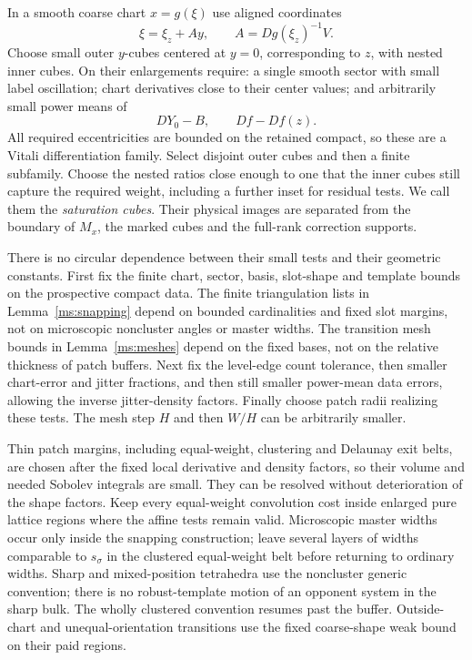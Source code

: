 \documentclass[11pt]{article}
\numberwithin{equation}{section}
\theoremstyle{definition}
\theoremstyle{remark}
\begin{document}
In a smooth coarse chart $x=g(\xi)$ use aligned coordinates
\[
 \xi=\xi_z+A y,\qquad A=Dg(\xi_z)^{-1}V.
\]
Choose small outer $y$-cubes centered at $y=0$, corresponding to $z$,
with nested inner cubes.
On their enlargements require: a single smooth sector with small
label oscillation; chart derivatives close to their center values;
and arbitrarily small power means of
\[
                         DY_0-B,\qquad Df-Df(z).
\]
All required eccentricities are bounded on the retained compact, so
these are a Vitali differentiation family.  Select disjoint outer
cubes and then a finite subfamily.  Choose the nested ratios close
enough to one that the inner cubes still capture the required weight,
including a further inset for residual tests.  We call them the
\emph{saturation cubes}.  Their physical images are separated from the
boundary of $M_x$, the marked cubes and the full-rank correction
supports.

There is no circular dependence between their small tests and their
geometric constants.  First fix the finite chart, sector, basis,
slot-shape and template bounds on the prospective compact data.
The finite triangulation lists in Lemma~\ref{ms:snapping}
depend on bounded cardinalities and fixed slot margins, not on
microscopic noncluster angles or master widths.  The transition mesh
bounds in Lemma~\ref{ms:meshes} depend on the fixed bases, not on the
relative thickness of patch buffers.  Next fix the level-edge
count tolerance, then smaller chart-error and jitter fractions,
and then still smaller power-mean data errors, allowing the inverse
jitter-density factors.  Finally choose patch radii realizing these
tests.  The mesh step $H$ and then $W/H$ can be arbitrarily smaller.

Thin patch margins, including equal-weight, clustering and Delaunay
exit belts, are chosen after the fixed local derivative and density
factors, so their volume and needed Sobolev integrals are small.
They can be resolved without deterioration of the shape factors.
Keep every equal-weight convolution cost inside enlarged pure lattice
regions where the affine tests remain valid.  Microscopic master
widths occur only inside the snapping construction; leave several
layers of widths comparable to $s_\sigma$ in the clustered
equal-weight belt before returning to ordinary widths.  Sharp and
mixed-position tetrahedra use the noncluster generic convention;
there is no robust-template motion of an opponent system in the
sharp bulk.  The wholly clustered convention resumes past the
buffer.  Outside-chart and unequal-orientation transitions use the
fixed coarse-shape weak bound on their paid regions.
\end{document}
